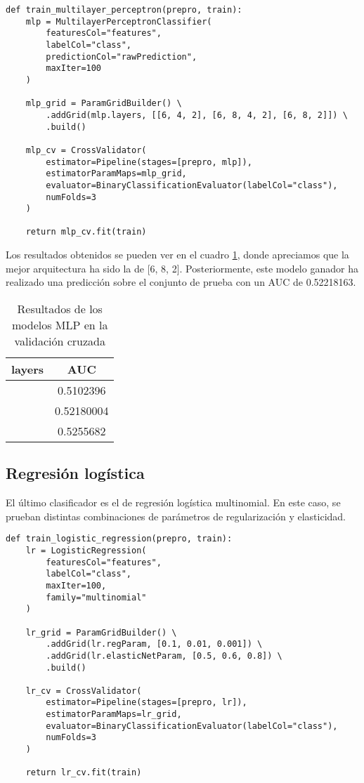 \begin{lstlisting}
def train_multilayer_perceptron(prepro, train):
    mlp = MultilayerPerceptronClassifier(
        featuresCol="features",
        labelCol="class",
        predictionCol="rawPrediction",
        maxIter=100
    )

    mlp_grid = ParamGridBuilder() \
        .addGrid(mlp.layers, [[6, 4, 2], [6, 8, 4, 2], [6, 8, 2]]) \
        .build()

    mlp_cv = CrossValidator(
        estimator=Pipeline(stages=[prepro, mlp]),
        estimatorParamMaps=mlp_grid,
        evaluator=BinaryClassificationEvaluator(labelCol="class"),
        numFolds=3
    )

    return mlp_cv.fit(train)
\end{lstlisting}

Los resultados obtenidos se pueden ver en el cuadro \ref{tab:validation-mlp},
donde apreciamos que la mejor arquitectura ha sido la de [6, 8, 2].
Posteriormente, este modelo ganador ha realizado una predicción sobre el
conjunto de prueba con un AUC de 0.52218163.

\begin{table}[h!]
    \caption{Resultados de los modelos MLP en la validación cruzada}
    \label{tab:validation-mlp}
    \begin{center}
        \begin{tabular}{ |c|c| }
            \hline
            \textbf{layers} & \textbf{AUC} \\
            \hline
            [6, 4, 2]       & 0.5102396    \\
            \hline
            [6, 8, 4, 2]    & 0.52180004   \\
            \hline
            [6, 8, 2]       & 0.5255682    \\
            \hline
        \end{tabular}
    \end{center}
\end{table}

\subsection{Regresión logística}

El último clasificador es el de regresión logística multinomial. En este caso,
se prueban distintas combinaciones de parámetros de regularización y
elasticidad.

\begin{lstlisting}
def train_logistic_regression(prepro, train):
    lr = LogisticRegression(
        featuresCol="features",
        labelCol="class",
        maxIter=100,
        family="multinomial"
    )

    lr_grid = ParamGridBuilder() \
        .addGrid(lr.regParam, [0.1, 0.01, 0.001]) \
        .addGrid(lr.elasticNetParam, [0.5, 0.6, 0.8]) \
        .build()

    lr_cv = CrossValidator(
        estimator=Pipeline(stages=[prepro, lr]),
        estimatorParamMaps=lr_grid,
        evaluator=BinaryClassificationEvaluator(labelCol="class"),
        numFolds=3
    )

    return lr_cv.fit(train)
\end{lstlisting}

